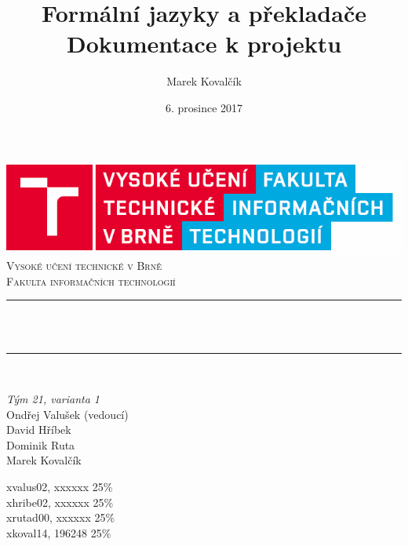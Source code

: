 \documentclass[11pt]{article}
\title{Formální jazyky a překladače \\[0.5 cm] Dokumentace k projektu}
\author{Marek Kovalčík}
\date{6. prosince 2017}
\makeatletter
\let\thetitle\@title
\let\thedate\@date
\makeatother
\begin{document}
	
	
	\begin{titlepage}
		\centering
		\vspace*{0.5 cm}
		\includegraphics[scale = 0.3]{logo.png}\\[2.0 cm]
		\textsc{\LARGE Vysoké učení technické v Brně}\\[0.3 cm]
		\textsc{\Large Fakulta informačních technologií}\\[2.0 cm]
		\rule{\linewidth}{0.2 mm} \\[2.0 cm]
		{ \huge \bfseries \thetitle}\\[2.0 cm]
		\rule{\linewidth}{0.2 mm} \\[2.0 cm]
		
		\begin{minipage}{0.4\textwidth}
			\begin{flushleft} \large
				\emph{Tým 21, varianta 1}\\[0.5 cm]
				Ondřej Valušek (vedoucí) \\
				David Hříbek	\\
				Dominik Ruta \\
				Marek Kovalčík
			\end{flushleft}
		\end{minipage}
		\begin{minipage}{0.4\textwidth}
			\begin{flushright} \large
				\vspace{1 cm}
				xvalus02, xxxxxx \hspace{1 cm}25\%\\
				xhribe02, xxxxxx \hspace{1 cm}25\%\\
				xrutad00, xxxxxx \hspace{1 cm}25\%\\
				xkoval14, 196248 \hspace{1 cm}25\%\\								
			\end{flushright}
		\end{minipage}\\[2 cm]
		
		{\large \thedate}\\[2 cm]
		
		\vfill
		
	\end{titlepage}
	\newpage
	\tableofcontents
	\clearpage
	
\end{document}
